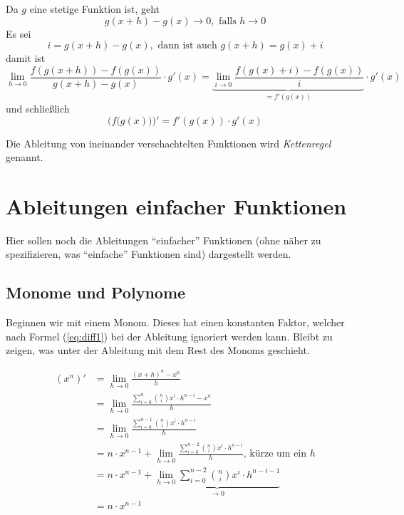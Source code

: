 Da $g$ eine stetige Funktion ist, geht
\begin{equation*}
g(x+h)-g(x) \longrightarrow 0,\text{ falls } h\rightarrow 0
\end{equation*}
Es sei 
\begin{equation}
i = g(x+h)-g(x), \text{ dann ist auch } g(x+h) = g(x)+i
\end{equation}
damit ist
\begin{equation}
\lim_{h\rightarrow 0} \frac{f(g(x+h))-f(g(x))}{g(x+h)-g(x)} \cdot g'(x) = 
\underbrace{\lim_{i\rightarrow 0} \frac{f(g(x)+i)-f(g(x))}{i}}_{=f'(g(x))} \cdot g'(x)
\end{equation}
und schließlich
\begin{equation}
\Big(f\big( g(x) \big)\Big)' = f'(g(x))\cdot g'(x)
\end{equation}
\begin{definition}
Die Ableitung von ineinander verschachtelten Funktionen wird \emph{Kettenregel} genannt.
\end{definition}

\section{Ableitungen einfacher Funktionen}

Hier sollen noch die Ableitungen "`einfacher"' Funktionen (ohne näher zu spezifizieren, was "`einfache"' Funktionen sind)  dargestellt werden. 

\subsection{Monome und Polynome}

Beginnen wir mit einem Monom. Dieses hat einen konstanten Faktor, welcher nach Formel (\ref{eq:diff1}) bei der Ableitung ignoriert werden kann. Bleibt zu zeigen, was unter der Ableitung mit dem Rest des Monoms geschieht. 

\begin{equation}
\begin{split}
(x^n)' &= \lim_{h\rightarrow 0} \frac{(x+h)^n - x^n}{h} \\
&= \lim_{h\rightarrow 0} \frac{\sum_{i=0}^{n}\binom{n}{i} x^i \cdot h^{n-i} - x^n}{h}\\
&= \lim_{h\rightarrow 0} \frac{\sum_{i=0}^{n-1}\binom{n}{i} x^i \cdot h^{n-i}}{h}\\
&= n\cdot x^{n-1} + \lim_{h\rightarrow 0} \frac{\sum_{i=0}^{n-2}\binom{n}{i} x^i \cdot h^{n-i}}{h} \text{, kürze um ein $h$} \\
&= n\cdot x^{n-1} + \underbrace{\lim_{h\rightarrow 0} \sum_{i=0}^{n-2}\binom{n}{i} x^i \cdot h^{n-i-1}}_{\rightarrow 0}\\
&= n\cdot x^{n-1}
\end{split}
\end{equation}


